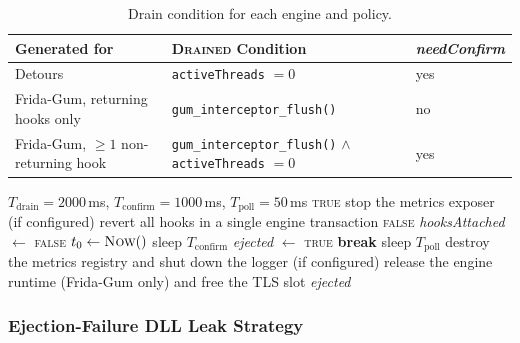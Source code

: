 \begin{table}[H]
	\centering
	\small
	\begin{tabularx}{\textwidth}{@{}l >{\RaggedRight}X l@{}}
		\toprule
		\textbf{Generated for} & \textbf{\textsc{Drained} Condition} & \textbf{\textit{needConfirm}} \\
		\midrule
		Detours & \texttt{activeThreads} $=0$ & yes \\
		\addlinespace
		Frida-Gum, returning hooks only & \texttt{gum\_interceptor\_flush()} & no \\
		\addlinespace
		Frida-Gum, $\ge 1$ non-returning hook & \texttt{gum\_interceptor\_flush()} $\wedge$ \texttt{activeThreads} $=0$ & yes \\
		\bottomrule
	\end{tabularx}
	\caption{Drain condition for each engine and policy.}
	\label{tab:drain_variants}
\end{table}

\begin{algorithm}[t]
	\caption{\texttt{DeinitializeHooks}. \texttt{Drained} and \texttt{needConfirm} are fixed per engine and policy when the code is generated (\cref{tab:drain_variants}); they are not evaluated per call.}
	\label{alg:deinit}
	\begin{algorithmic}[1]
		\Require $T_{\mathrm{drain}}=2000$\,ms, $T_{\mathrm{confirm}}=1000$\,ms, $T_{\mathrm{poll}}=50$\,ms
		 \State \Return \textsc{true} \EndIf
		\State stop the metrics exposer (if configured)
		\State revert all hooks in a single engine transaction
		 \State \Return \textsc{false} \EndIf
		\State \textit{hooksAttached} $\gets$ \textsc{false}
		\EndIf
		\State $t_0 \gets \textsc{Now}()$
		 \State sleep $T_{\mathrm{confirm}}$ \EndIf
		\State \textit{ejected} $\gets$ \textsc{true}
		\State \textbf{break}
		\EndIf
		\EndIf
		\State sleep $T_{\mathrm{poll}}$
		\EndWhile
		\State destroy the metrics registry and shut down the logger (if configured)
		\State release the engine runtime (Frida-Gum only) and free the TLS slot
		\EndIf
		\State \Return \textit{ejected}
	\end{algorithmic}
\end{algorithm}

\subsubsection{Ejection-Failure DLL Leak Strategy}
\label{subsec:dll_leak}

